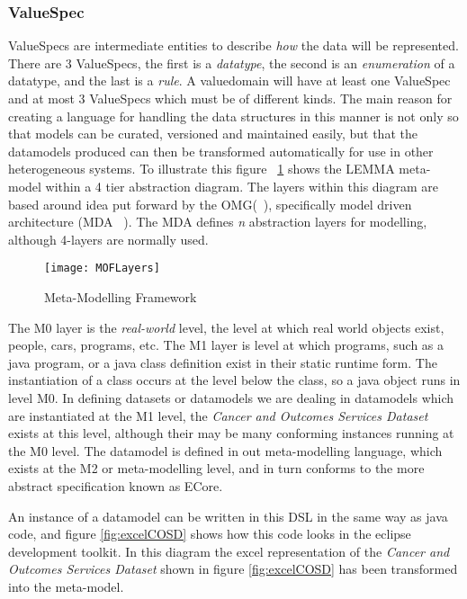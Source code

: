 \subsubsection{ValueSpec}
ValueSpecs are intermediate entities to describe \emph{how} the data will be represented. There are 3 ValueSpecs, the first is a \emph{datatype}, the second is an \emph{enumeration} of a datatype, and the last is a \emph{rule}. A valuedomain will have at least one ValueSpec and at most 3 ValueSpecs which must be of different kinds.
The main reason for creating a language for handling the data structures in this manner is not only so that models can be curated, versioned and maintained easily, but that the datamodels produced can then be transformed automatically for use in other heterogeneous systems. To illustrate this figure ~\ref{fig:mofLayers} shows the LEMMA meta-model within a 4 tier abstraction diagram. The layers within this diagram are based around idea put forward by the  OMG(~\cite{OMG}), specifically model driven architecture (MDA ~\cite{MDA}). The MDA defines \emph{n} abstraction layers for modelling, although 4-layers are normally used.
\begin{figure}[here] 
	\texttt{[image: MOFLayers]}
	\caption{Meta-Modelling Framework} 
	\label{fig:mofLayers}
\end{figure}
The M0 layer is the \emph{real-world} level, the level at which real world objects exist, people, cars, programs, etc. The M1 layer is level at which programs, such as a java program, or a java class definition exist in their static runtime form. The instantiation of a class occurs at the level below the class, so a java object runs in level M0. In defining datasets or datamodels we are dealing in datamodels which are instantiated at the M1 level, the \emph{Cancer and Outcomes Services Dataset} exists at this level, although their may be many conforming instances running at the M0 level. The datamodel is defined in out meta-modelling language, which exists at the M2 or meta-modelling level, and in turn conforms to the more abstract specification known as ECore.

An instance of a datamodel can be written in this DSL in the same way as java code, and figure \ref{fig:excelCOSD} shows how this code looks in the eclipse development toolkit. In this diagram the excel representation of the \emph{Cancer and Outcomes Services Dataset} shown in figure \ref{fig:excelCOSD} has been transformed into the meta-model.


